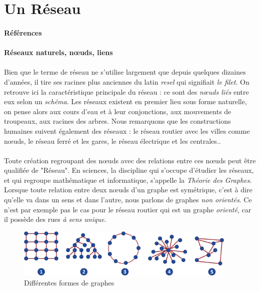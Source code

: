 \section{Un Réseau}
\paragraph{Références} \cite{DarkWeb0}

\paragraph{Réseaux naturels, n\oe{}uds, liens}

\paragraph{} Bien que le terme de réseau ne s'utilise largement que depuis quelques dizaines d'années, il tire ses
racines plus anciennes du latin \emph{resel} qui signifiait \emph{le filet}. On retrouve ici la caractéristique
principale du réseau : ce sont des \emph{n\oe{}uds liés} entre eux selon un \emph{schéma}. Les réseaux existent en
premier lieu sous forme naturelle, on pense alors aux cours d'eau et à leur conjonctions, aux mouvements de troupeaux,
aux racines des arbres. Nous remarquons que les constructions humaines suivent également des réseaux : le réseau routier
avec les villes comme n\oe{}uds, le réseau ferré et les gares, le réseau électrique et les centrales..

\paragraph{} Toute création regroupant des n\oe{}uds avec des relations entre ces n\oe{}uds peut être qualifiée de "Réseau". En sciences,
la discipline qui s'occupe d'étudier les réseaux, et qui regroupe mathématique et informatique, s'appelle
la \emph{Théorie des Graphes}. Lorsque toute relation entre deux n\oe{}uds d'un graphe est symétrique, c'est à dire qu'elle va
dans un sens et dans l'autre, nous parlons de graphes \emph{non orientés}. Ce n'est par exemple pas le cas pour le
réseau routier qui est un graphe \emph{orienté}, car il possède des rues \emph{à sens unique}.

\begin{figure}[h]
    \centering
    \includegraphics[width=400px]{chapters/02/images/reseaux.png}
    \caption{\label{Réseaux, graphes} Différentes formes de graphes}
\end{figure}


